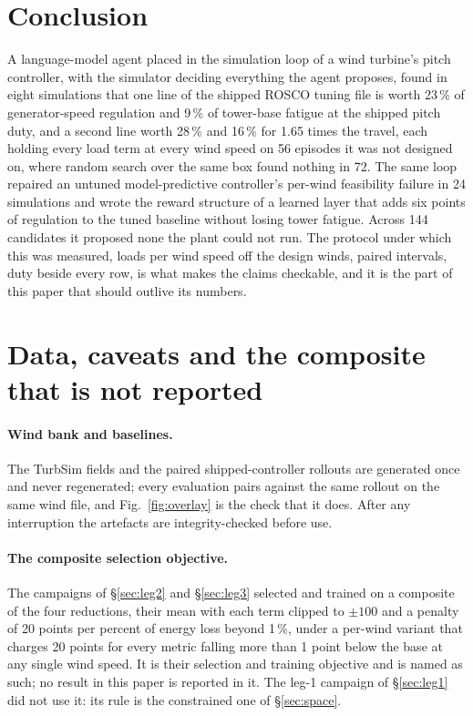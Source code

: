 \documentclass{article}
\begin{document}
\section{Conclusion}
\label{sec:conclusion}
A language-model agent placed in the simulation loop of a wind turbine's pitch controller, with the simulator deciding everything the agent proposes, found in eight simulations that one line of the shipped ROSCO tuning file is worth 23\,\% of generator-speed regulation and 9\,\% of tower-base fatigue at the shipped pitch duty, and a second line worth 28\,\% and 16\,\% for 1.65 times the travel, each holding every load term at every wind speed on 56 episodes it was not designed on, where random search over the same box found nothing in 72. The same loop repaired an untuned model-predictive controller's per-wind feasibility failure in 24 simulations and wrote the reward structure of a learned layer that adds six points of regulation to the tuned baseline without losing tower fatigue. Across 144 candidates it proposed none the plant could not run. The protocol under which this was measured, loads per wind speed off the design winds, paired intervals, duty beside every row, is what makes the claims checkable, and it is the part of this paper that should outlive its numbers.

\clearpage


\clearpage

\appendix

\section{Data, caveats and the composite that is not reported}
\label{app:objective}
\paragraph{Wind bank and baselines.} The TurbSim fields and the paired shipped-controller rollouts are generated once and never regenerated; every evaluation pairs against the same rollout on the same wind file, and Fig.~\ref{fig:overlay} is the check that it does. After any interruption the artefacts are integrity-checked before use.

\paragraph{The composite selection objective.} The campaigns of §\ref{sec:leg2} and §\ref{sec:leg3} selected and trained on a composite of the four reductions, their mean with each term clipped to $\pm100$ and a penalty of 20 points per percent of energy loss beyond 1\,\%, under a per-wind variant that charges 20 points for every metric falling more than 1 point below the base at any single wind speed. It is their selection and training objective and is named as such; no result in this paper is reported in it. The leg-1 campaign of §\ref{sec:leg1} did not use it: its rule is the constrained one of §\ref{sec:space}.
\end{document}

